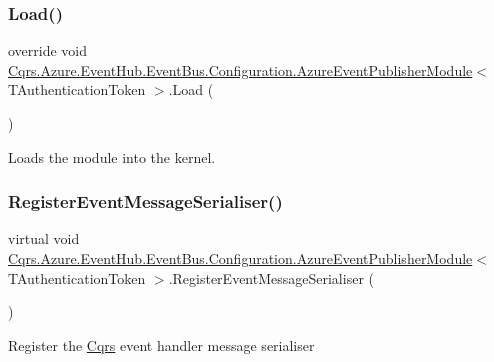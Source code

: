 \subsubsection{\texorpdfstring{Load()}{Load()}}
{\footnotesize\ttfamily override void \hyperlink{classCqrs_1_1Azure_1_1EventHub_1_1EventBus_1_1Configuration_1_1AzureEventPublisherModule}{Cqrs.\+Azure.\+Event\+Hub.\+Event\+Bus.\+Configuration.\+Azure\+Event\+Publisher\+Module}$<$ T\+Authentication\+Token $>$.Load (\begin{DoxyParamCaption}{ }\end{DoxyParamCaption})}



Loads the module into the kernel. 

\mbox{\label{classCqrs_1_1Azure_1_1EventHub_1_1EventBus_1_1Configuration_1_1AzureEventPublisherModule_aa4d57a9b3e15f05ccb6889c517ec24d6}} 
\subsubsection{\texorpdfstring{Register\+Event\+Message\+Serialiser()}{RegisterEventMessageSerialiser()}}
{\footnotesize\ttfamily virtual void \hyperlink{classCqrs_1_1Azure_1_1EventHub_1_1EventBus_1_1Configuration_1_1AzureEventPublisherModule}{Cqrs.\+Azure.\+Event\+Hub.\+Event\+Bus.\+Configuration.\+Azure\+Event\+Publisher\+Module}$<$ T\+Authentication\+Token $>$.Register\+Event\+Message\+Serialiser (\begin{DoxyParamCaption}{ }\end{DoxyParamCaption})\hspace{0.3cm}{\ttfamily [virtual]}}



Register the \hyperlink{namespaceCqrs}{Cqrs} event handler message serialiser 

